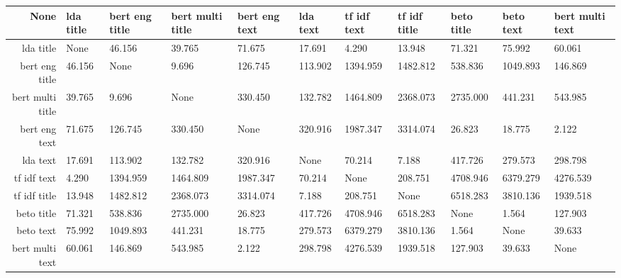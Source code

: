 \begin{tabular}{|r|l|l|l|l|l|l|l|l|l|l|}
  \hline
  None & lda title & bert eng title & bert multi title & bert eng text & lda text & tf idf text & tf idf title & beto title & beto text & bert multi text \\ 
  \hline
  lda title & None & 46.156 & 39.765 & 71.675 & 17.691 & 4.290 & 13.948 & 71.321 & 75.992 & 60.061 \\ 
  \hline
  bert eng title & 46.156 & None & 9.696 & 126.745 & 113.902 & 1394.959 & 1482.812 & 538.836 & 1049.893 & 146.869 \\ 
  \hline
  bert multi title & 39.765 & 9.696 & None & 330.450 & 132.782 & 1464.809 & 2368.073 & 2735.000 & 441.231 & 543.985 \\ 
  \hline
  bert eng text & 71.675 & 126.745 & 330.450 & None & 320.916 & 1987.347 & 3314.074 & 26.823 & 18.775 & 2.122 \\ 
  \hline
  lda text & 17.691 & 113.902 & 132.782 & 320.916 & None & 70.214 & 7.188 & 417.726 & 279.573 & 298.798 \\ 
  \hline
  tf idf text & 4.290 & 1394.959 & 1464.809 & 1987.347 & 70.214 & None & 208.751 & 4708.946 & 6379.279 & 4276.539 \\ 
  \hline
  tf idf title & 13.948 & 1482.812 & 2368.073 & 3314.074 & 7.188 & 208.751 & None & 6518.283 & 3810.136 & 1939.518 \\ 
  \hline
  beto title & 71.321 & 538.836 & 2735.000 & 26.823 & 417.726 & 4708.946 & 6518.283 & None & 1.564 & 127.903 \\ 
  \hline
  beto text & 75.992 & 1049.893 & 441.231 & 18.775 & 279.573 & 6379.279 & 3810.136 & 1.564 & None & 39.633 \\ 
  \hline
  bert multi text & 60.061 & 146.869 & 543.985 & 2.122 & 298.798 & 4276.539 & 1939.518 & 127.903 & 39.633 & None \\ 
  \hline
\end{tabular}
